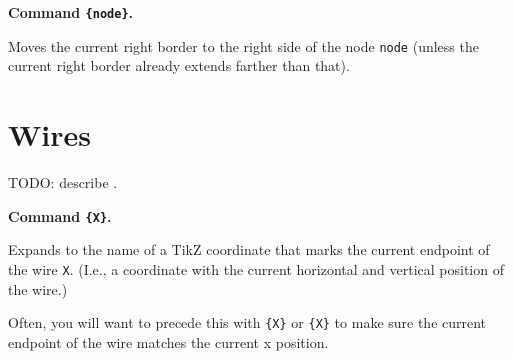 \documentclass[a4paper]{article}
\makeatletter
\newenvironment{command}[2]{%
  \medskip\noindent\textbf{Command \macroanchor#1\texttt{#2}.} 
}{%
}
\newcommand\nobsstring[1]{{\escapechar=-1\xdef\@tempa{\string#1}}}
\DeclareRobustCommand\macrolink[1]{\nobsstring#1\hyperref[command-\@tempa]{\texttt{\string#1}}}
\DeclareRobustCommand\macroanchor[1]{\nobsstring#1\label{command-\@tempa}\texttt{\string#1}}
\makeatother
\begin{document}
\begin{command}\registerRightBorderCandidate{\{node\}}
  Moves the current right border to the right side of the node
  \texttt{node} (unless the current right border already extends
  farther than that).

\begin{example}
\end{example}
\end{command}




\section{Wires}
\label{sec:wires}

TODO: describe \macrolink\newWire.

\begin{command}\getWireCoord{\{X\}}
  Expands to the name of a TikZ coordinate that marks the current
  endpoint of the wire \texttt{X}. (I.e., a coordinate with the
  current horizontal and vertical position of the wire.)

  Often, you will want to precede this with
  \macrolink{\drawWires}\texttt{\{X\}} or
  \macrolink{\skipWires}\texttt{\{X\}} to make sure the current
  endpoint of the wire matches the current x position.

\begin{example}
\end{example}
\end{command}
\end{document}

